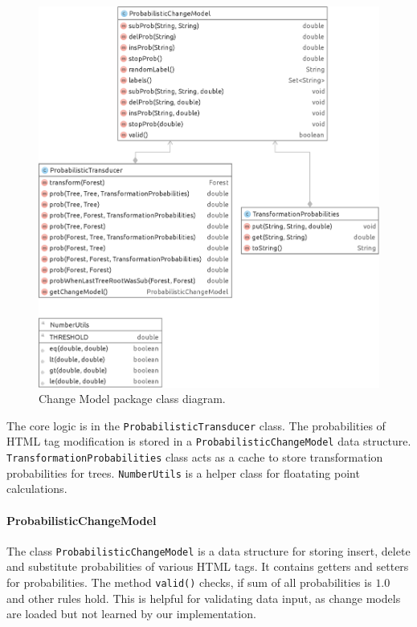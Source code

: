 \begin{figure}[h]
	\centering
	\includegraphics[width=1.0\textwidth]{figures/package-changemodel}
	\caption{Change Model package class diagram.}
	\label{fig:package-changemodel}
\end{figure}

The core logic is in the \texttt{ProbabilisticTransducer} class. The probabilities of HTML tag modification is stored in a \texttt{ProbabilisticChangeModel} data structure. \texttt{TransformationProbabilities} class acts as a cache to store transformation probabilities for trees. \texttt{NumberUtils} is a helper class for floatating point calculations.


\paragraph{ProbabilisticChangeModel} The class \texttt{ProbabilisticChangeModel} is a data structure for storing insert, delete and substitute probabilities of various HTML tags. It contains getters and setters for probabilities. The method \texttt{valid()} checks, if sum of all probabilities is $1.0$ and other rules hold. This is helpful for validating data input, as change models are loaded but not learned by our implementation.

